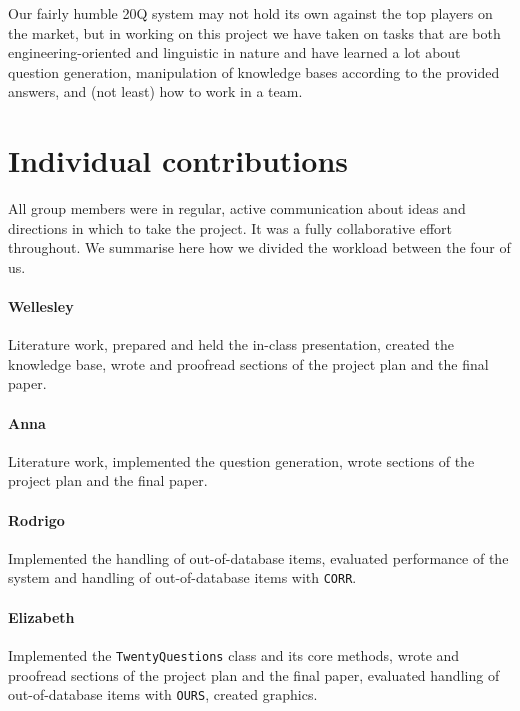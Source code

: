 \documentclass[11pt,a4paper]{article}
\begin{document}
Our fairly humble 20Q system may not hold its own against the top players on the market, but in working on this project we have taken on tasks that are both engineering-oriented and linguistic in nature and have learned a lot about question generation, manipulation of knowledge bases according to the provided answers, and (not least) how to work in a team. 





\appendix

\section{Individual contributions}
\label{app:contributions}

All group members were in regular, active communication about ideas and directions in which to take the project.
It was a fully collaborative effort throughout.
We summarise here how we divided the workload between the four of us.

\paragraph{Wellesley} Literature work, prepared and held the in-class presentation, created the knowledge base, wrote and proofread sections of the project plan and the final paper.

\paragraph{Anna} Literature work, implemented the question generation, wrote sections of the project plan and the final paper.

\paragraph{Rodrigo} Implemented the handling of out-of-database items, evaluated performance of the system and handling of out-of-database items with \texttt{CORR}.

\paragraph{Elizabeth} Implemented the \texttt{TwentyQuestions} class and its core methods, wrote and proofread sections of the project plan and the final paper, evaluated handling of out-of-database items with \texttt{OURS}, created graphics.
\end{document}
